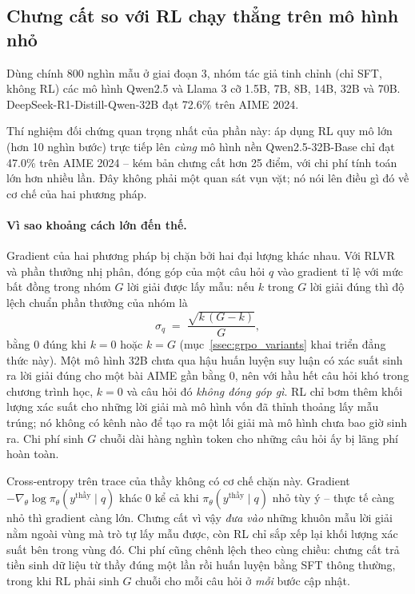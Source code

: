 \subsection{Chưng cất so với RL chạy thẳng trên mô hình nhỏ}
\label{ssec:r1_distill}
Dùng chính 800 nghìn mẫu ở giai đoạn 3, nhóm tác giả tinh chỉnh (chỉ SFT, không RL) các mô hình Qwen2.5 và Llama 3 cỡ 1.5B, 7B, 8B, 14B, 32B và 70B. DeepSeek-R1-Distill-Qwen-32B đạt 72.6\% trên AIME 2024.

Thí nghiệm đối chứng quan trọng nhất của phần này: áp dụng RL quy mô lớn (hơn 10 nghìn bước) trực tiếp lên \emph{cùng} mô hình nền Qwen2.5-32B-Base chỉ đạt 47.0\% trên AIME 2024 -- kém bản chưng cất hơn 25 điểm, với chi phí tính toán lớn hơn nhiều lần. Đây không phải một quan sát vụn vặt; nó nói lên điều gì đó về cơ chế của hai phương pháp.

\paragraph{Vì sao khoảng cách lớn đến thế.}
Gradient của hai phương pháp bị chặn bởi hai đại lượng khác nhau. Với RLVR và phần thưởng nhị phân, đóng góp của một câu hỏi $q$ vào gradient tỉ lệ với mức bất đồng trong nhóm $G$ lời giải được lấy mẫu: nếu $k$ trong $G$ lời giải đúng thì độ lệch chuẩn phần thưởng của nhóm là
\[
\sigma_q \;=\; \frac{\sqrt{k\,(G-k)}}{G},
\]
bằng 0 đúng khi $k = 0$ hoặc $k = G$ (mục~\ref{ssec:grpo_variants} khai triển đẳng thức này). Một mô hình 32B chưa qua hậu huấn luyện suy luận có xác suất sinh ra lời giải đúng cho một bài AIME gần bằng 0, nên với hầu hết câu hỏi khó trong chương trình học, $k = 0$ và câu hỏi đó \emph{không đóng góp gì}. RL chỉ bơm thêm khối lượng xác suất cho những lời giải mà mô hình vốn đã thỉnh thoảng lấy mẫu trúng; nó không có kênh nào để tạo ra một lối giải mà mô hình chưa bao giờ sinh ra. Chi phí sinh $G$ chuỗi dài hàng nghìn token cho những câu hỏi ấy bị lãng phí hoàn toàn.

Cross-entropy trên trace của thầy không có cơ chế chặn này. Gradient $-\nabla_\theta \log \pi_\theta(y^{\text{thầy}}\mid q)$ khác 0 kể cả khi $\pi_\theta(y^{\text{thầy}}\mid q)$ nhỏ tùy ý -- thực tế càng nhỏ thì gradient càng lớn. Chưng cất vì vậy \emph{đưa vào} những khuôn mẫu lời giải nằm ngoài vùng mà trò tự lấy mẫu được, còn RL chỉ sắp xếp lại khối lượng xác suất bên trong vùng đó. Chi phí cũng chênh lệch theo cùng chiều: chưng cất trả tiền sinh dữ liệu từ thầy đúng một lần rồi huấn luyện bằng SFT thông thường, trong khi RL phải sinh $G$ chuỗi cho mỗi câu hỏi ở \emph{mỗi} bước cập nhật.


